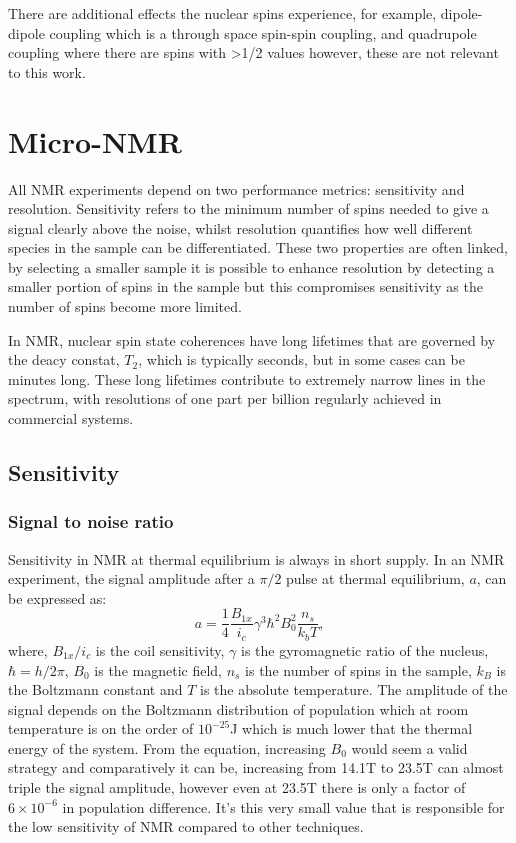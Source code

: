 There are additional effects the nuclear spins experience, for example, dipole-dipole coupling which
is a through space spin-spin coupling, and quadrupole coupling where there are spins with >1/2 values
however, these are not relevant to this work.

\newpage

\section{Micro-NMR}\label{Micro-NMR}

All NMR experiments depend on two performance metrics: sensitivity and resolution. Sensitivity
refers to the minimum number of spins needed to give a signal clearly above the noise, whilst resolution
quantifies how well different species in the sample can be differentiated. These two properties
are often linked, by selecting a smaller sample it is possible to enhance resolution by detecting
a smaller portion of spins in the sample but this compromises sensitivity as the number of spins become more limited.

 In NMR, nuclear spin state coherences have long lifetimes that are governed by the deacy constat, $T_2$, which is
 typically seconds, but in some cases can be minutes long. These long lifetimes contribute to extremely
 narrow lines in the spectrum, with resolutions of one part per billion regularly achieved in
 commercial systems.

 \subsection{Sensitivity}

 \subsubsection{Signal to noise ratio}


 Sensitivity in NMR at thermal equilibrium is always in short supply. In an NMR experiment, the signal amplitude after a $\pi/2$ pulse
 at thermal equilibrium, $a$, can be expressed as:
\begin{equation}\label{eqn:Hale}
 a = \frac{1}{4}\frac{B_{1x}}{i_c}\gamma^3\hbar^2B_0^2\frac{n_s}{k_bT},
\end{equation}
where, $B_{1x}/i_c$ is the coil sensitivity, $\gamma$ is the gyromagnetic ratio of the nucleus,$\hbar = h/2\pi$, $B_0$ is the magnetic field, $n_s$ is
the number of spins in the sample, $k_B$ is the Boltzmann constant and $T$ is the absolute temperature. The amplitude
of the signal depends on the Boltzmann distribution of population which at room temperature is on the order of $10^{-25}$J
which is much lower that the thermal energy of the system. From the equation, increasing $B_0$ would seem a
valid strategy and comparatively it can be, increasing from 14.1T to 23.5T can almost triple the signal amplitude,
however even at 23.5T there is only a factor of ~$6\times10^{-6}$ in population difference. It's this
very small value that is responsible for the low sensitivity of NMR compared to other techniques.

